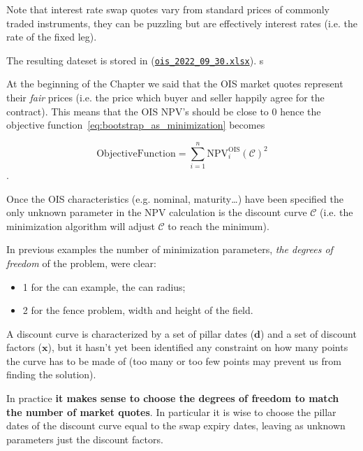 Note that interest rate swap quotes vary from standard prices of commonly traded instruments, they can be puzzling but are effectively interest rates (i.e. the rate of the fixed leg).

The resulting dateset is stored in (\href{https://github.com/matteosan1/finance_course/raw/master/input_files/ois_2022_09_30.xlsx}{\texttt{ois\_2022\_09\_30.xlsx}}). s

At the beginning of the Chapter we said that the OIS market quotes represent their \emph{fair} prices (i.e. the price which buyer and seller happily agree for the contract). This means that the OIS NPV's should be close to 0 hence the objective function~\ref{eq:bootstrap_as_minimization} becomes

\begin{equation}
\mathrm{Objective Function} = \sum_{i=1}^{n}\mathrm{NPV}^\mathrm{OIS}_i(\mathcal{C})^2
\end{equation}.

Once the OIS characteristics (e.g. nominal, maturity\ldots) have been specified the only unknown parameter in the NPV calculation is the discount curve $\mathcal{C}$ (i.e. the minimization algorithm will adjust $\mathcal{C}$ to reach the minimum).

In previous examples the number of minimization parameters, \emph{the degrees of freedom} of the problem, were clear:
\begin{itemize}
\item 1 for the can example, the can radius;
\item 2 for the fence problem, width and height of the field.
\end{itemize}

A discount curve is characterized by a set of pillar dates ($\mathbf{d}$) and a set of discount factors ($\mathbf{x}$), but it hasn't yet been identified any constraint on how many points the curve has to be made of (too many or too few points may prevent us from finding the solution).

In practice \textbf{it makes sense to choose the degrees of freedom to match the number of market quotes}. In particular it is wise to choose the pillar dates of the discount curve equal to the swap expiry dates, leaving as unknown parameters just the discount factors.

